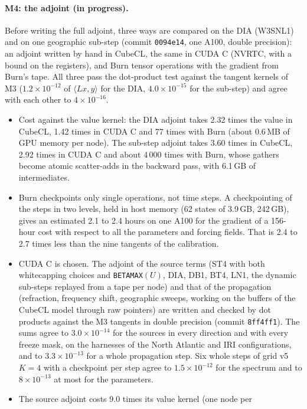 \documentclass[11pt,a4paper]{article}
\begin{document}
\paragraph{M4: the adjoint (in progress).} Before writing
the full adjoint, three ways are compared on the DIA (W3SNL1) and on one
geographic sub-step (commit \texttt{0094e14}, one A100, double
precision): an adjoint written by hand in CubeCL, the same in CUDA C
(NVRTC, with a bound on the registers), and Burn tensor operations with
the gradient from Burn's tape. All three pass the dot-product test
against the tangent kernels of M3 ($1.2\times10^{-12}$ of $\langle Lx,
y\rangle$ for the DIA, $4.0\times10^{-15}$ for the sub-step) and agree
with each other to $4\times10^{-16}$.
\begin{itemize}
\item Cost against the value kernel: the DIA adjoint takes 2.32 times
the value in CubeCL, 1.42 times in CUDA C and 77 times with Burn (about
0.6\,MB of GPU memory per node). The sub-step adjoint takes 3.60 times
in CubeCL, 2.92 times in CUDA C and about 4\,000 times with Burn, whose
gathers become atomic scatter-adds in the backward pass, with 6.1\,GB of
intermediates.
\item Burn checkpoints only single operations, not time steps. A
checkpointing of the steps in two levels, held in host memory (62
states of 3.9\,GB, 242\,GB), gives an estimated 2.1 to 2.4 hours on one
A100 for the gradient of a 156-hour cost with respect to all the
parameters and forcing fields. That is 2.4 to 2.7 times less than the
nine tangents of the calibration.
\item CUDA C is chosen. The adjoint of the source terms (ST4 with both
whitecapping choices and \texttt{BETAMAX}$(U)$, DIA, DB1, BT4, LN1, the
dynamic sub-steps replayed from a tape per node) and that of the
propagation (refraction, frequency shift, geographic sweeps, working on
the buffers of the CubeCL model through raw pointers) are written and
checked by dot products against the M3 tangents in double precision
(commit \texttt{8ff4ff1}). The sums agree to $3.0\times10^{-14}$ for the
sources in every direction and with every freeze mask, on the harnesses
of the North Atlantic and IRI configurations, and to
$3.3\times10^{-13}$ for a whole propagation step. Six whole steps of
grid v5 $K=4$ with a checkpoint per step agree to $1.5\times10^{-12}$
for the spectrum and to $8\times10^{-13}$ at most for the parameters.
\item The source adjoint costs 9.0 times its value kernel (one node per

\end{itemize}
\end{document}
